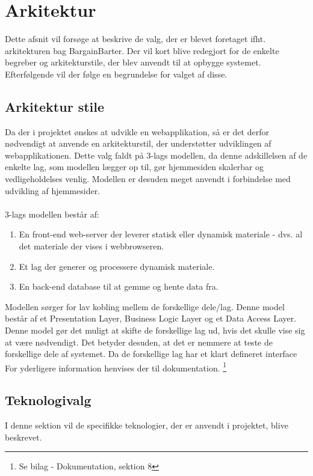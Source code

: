 \chapter{Arkitektur}
Dette afsnit vil forsøge at beskrive de valg, der er blevet foretaget ifht. arkitekturen bag BargainBarter. Der vil kort blive redegjort for de enkelte begreber og arkitekturstile, der blev anvendt til at opbygge systemet. Efterfølgende vil der følge en begrundelse for valget af disse.

\section{Arkitektur stile}
Da der i projektet ønskes at udvikle en webapplikation, så er det derfor nødvendigt at anvende en arkitekturstil, der understøtter udviklingen af webapplikationen.
Dette valg faldt på 3-lags modellen, da denne adskillelsen af de enkelte lag, som modellen lægger op til, gør hjemmesiden skalerbar og vedligeholdelses venlig. Modellen er desuden meget anvendt i forbindelse med udvikling af hjemmesider.\\ \\ 3-lags modellen består af:
\begin{enumerate}
	\item En front-end web-server der leverer statisk eller dynamisk materiale - dvs. al det materiale der vises i webbrowseren.
	\item Et lag der generer og processere dynamisk materiale.
	\item En back-end database til at gemme og hente data fra.
\end{enumerate}

\noindent Modellen sørger for lav kobling mellem de forskellige dele/lag. Denne model består af et Presentation Layer, Business Logic Layer og et Data Access Layer. Denne model gør det muligt at skifte de forskellige lag ud, hvis det skulle vise sig at være nødvendigt. Det betyder desuden, at det er nemmere at teste de forskellige dele af systemet. Da de forskellige lag har et klart defineret interface \\
For yderligere information henvises der til dokumentation. \footnote{Se bilag - Dokumentation, sektion 8}

\section{Teknologivalg}
I denne sektion vil de specifikke teknologier, der er anvendt i projektet, blive beskrevet.

